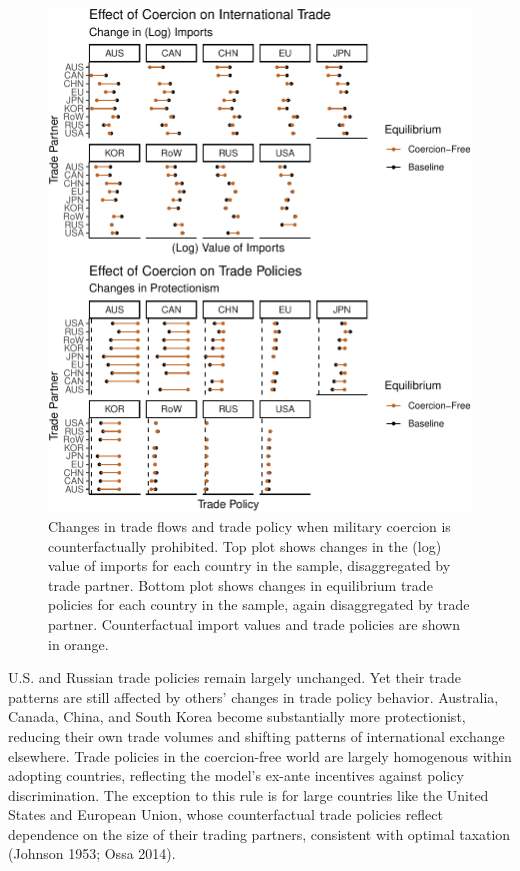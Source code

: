 \documentclass{puthesis}
\begin{document}
\begin{figure}
\centering
\includegraphics{figure/cfct1_X-1.pdf}
\caption{Changes in trade flows and trade policy when military coercion
is counterfactually prohibited. Top plot shows changes in the (log)
value of imports for each country in the sample, disaggregated by trade
partner. Bottom plot shows changes in equilibrium trade policies for
each country in the sample, again disaggregated by trade partner.
Counterfactual import values and trade policies are shown in orange.
\label{fig:cfct1_X}}
\end{figure}

U.S. and Russian trade policies remain largely unchanged. Yet their
trade patterns are still affected by others' changes in trade policy
behavior. Australia, Canada, China, and South Korea become substantially
more protectionist, reducing their own trade volumes and shifting
patterns of international exchange elsewhere. Trade policies in the
coercion-free world are largely homogenous within adopting countries,
reflecting the model's ex-ante incentives against policy discrimination.
The exception to this rule is for large countries like the United States
and European Union, whose counterfactual trade policies reflect
dependence on the size of their trading partners, consistent with
optimal taxation (Johnson 1953; Ossa 2014).
\end{document}
